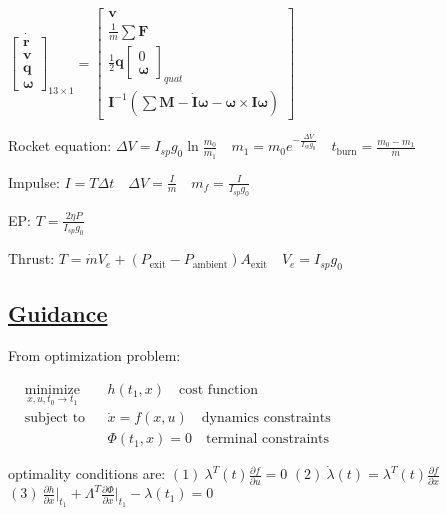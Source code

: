 \documentclass[11pt,landscape]{article}
\begin{document}
$
\dot{
\begin{bmatrix} \bm r \\ \bm v \\ \bm q \\ \bm \omega \end{bmatrix}}_{13\times1}
=
\begin{bmatrix} \bm v \\ \frac{1}{m} \sum \bm F 
\\ \frac{1}{2} \bm q \begin{bmatrix} 0 \\ \bm\omega \end{bmatrix}_{quat}
\\ \bm I^{-1}(\sum \bm M - \dot{\bm I} \bm\omega - \bm\omega \times \bm I \bm\omega)
\end{bmatrix}
$

Rocket equation:
$\Delta V = I_{sp} g_0 \ln\frac{m_0}{m_1}
\quad
m_1 = m_0 e^{-\frac{\Delta V}{I_{sp}g_0}}
\quad
t_{\text{burn}}=\frac{m_0-m_1}{\dot{m}}$

Impulse:
$I = T \Delta t
\quad
\Delta V = \frac{I}{m}
\quad
m_f = \frac{I}{I_{sp}g_0}
$

EP:
$T = \frac{2\eta P}{I_{sp}g_0}$

Thrust:
$T = \dot{m}V_e + (P_{\text{exit}} - P_{\text{ambient}})A_{\text{exit}}
\quad
V_e = I_{sp} g_0
$


\newpage
\subsection{\underline{Guidance}}

From optimization problem:

$
\begin{aligned}
& \underset{x, u, t_0 \rightarrow t_1}{\text{minimize}}
& & h(t_1, x) \quad \text{cost function} \\
& \text{subject to}
& & \dot{x} = f(x, u) \quad \text{dynamics constraints} \\
&&& \Phi(t_1, x) = 0 \quad \text{terminal constraints}
\end{aligned}
$

optimality conditions are:
$(1)\ \lambda^T(t) \frac{\partial f}{\partial u} = 0$ \quad
$(2)\ \dot{\lambda}(t) = \lambda^T(t) \frac{\partial f}{\partial x}$ \quad
$(3)\ \frac{\partial h}{\partial x}\Big|_{t_1} + 
\Lambda^T \frac{\partial \Phi}{\partial x}\Big|_{t_1} - 
\lambda(t_1) = 0$
\end{document}
